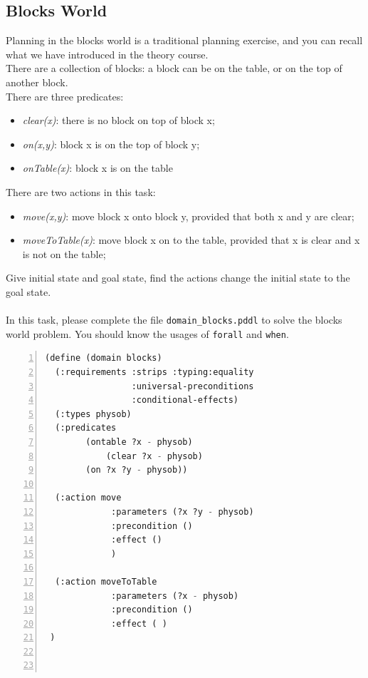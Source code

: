 \documentclass[a4paper, 11pt]{article}
\begin{document}
\subsection{Blocks World}
Planning in the blocks world is a traditional planning exercise, and you can recall what we have introduced in the theory course.
\\ There are a collection of blocks: a block can be on the table, or on the top of another block. 
\\ There are three predicates:  
\begin{itemize}

\item\textit{clear(x)}: there is no block on top of block x;

\item \textit {on(x,y)}: block x is on the top of block y;

\item   \textit {onTable(x)}: block x is on the table

\end{itemize}There are two actions in this task:
\begin{itemize}

\item\textit{move(x,y)}: move block x onto block y, provided that both x and y are clear;

\item \textit {moveToTable(x)}: move block x on to the table, provided that x is clear and x is not on the table;

\end{itemize}Give initial state and goal state, find the actions change the initial state to the goal state.
\\
\\
In this task, please complete the file \texttt{domain\_blocks.pddl} to solve the blocks world problem. You should know the usages of \texttt{forall} and \texttt{when}.

\begin{lstlisting}[title=domain\_blocks.pddl,frame=single,language=lisp,numbers=left]
(define (domain blocks)
  (:requirements :strips :typing:equality
                 :universal-preconditions
                 :conditional-effects)
  (:types physob)
  (:predicates   
  	    (ontable ?x - physob)
            (clear ?x - physob)	
	    (on ?x ?y - physob))
		
  (:action move
             :parameters (?x ?y - physob)
             :precondition ()
             :effect ()
             )

  (:action moveToTable
             :parameters (?x - physob)
             :precondition ()
             :effect ( )
 )



\end{lstlisting}
\end{document}
